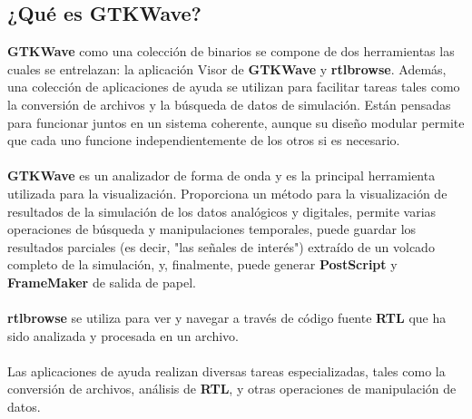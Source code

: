 \documentclass[10pt,graphicx,caption,rotating]{article}
\begin{document}
\subsection{¿Qué es GTKWave?}
\noindent
\textbf{GTKWave} como una colección de binarios se compone de dos herramientas las cuales se entrelazan: la aplicación Visor de \textbf{GTKWave} y \textbf{rtlbrowse}. Además, una colección de aplicaciones de ayuda se utilizan para facilitar tareas tales como la conversión de archivos y la búsqueda de datos de simulación. Están pensadas para funcionar juntos en un sistema coherente, aunque su diseño modular permite que cada uno funcione independientemente de los otros si es necesario.\\\\
\textbf{GTKWave} es un analizador de forma de onda y es la principal herramienta utilizada para la visualización. Proporciona un método para la visualización de resultados de la simulación de los datos analógicos y digitales, permite varias operaciones de búsqueda y manipulaciones temporales, puede guardar los resultados parciales (es decir, "las señales de interés") extraído de un volcado completo de la simulación, y, finalmente, puede generar \textbf{PostScript} y \textbf{FrameMaker} de salida de papel.\\\\
\textbf{rtlbrowse} se utiliza para ver y navegar a través de código fuente \textbf{RTL} que ha sido analizada y procesada en un archivo.\\\\
Las aplicaciones de ayuda realizan diversas tareas especializadas, tales como la conversión de archivos, análisis de \textbf{RTL}, y otras operaciones de manipulación de datos.
\end{document}

